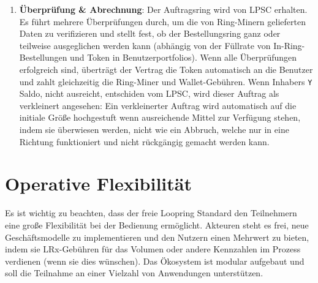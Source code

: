 \documentclass[UTF8,nofonts]{article}
\makeatletter
\newenvironment{figurehere}
 {\def\@captype{figure}}
 {}
\makeatother
\begin{document}
\begin{multicols}{2}
\begin{enumerate}
\item \textbf{Überprüfung \& Abrechnung}: Der Auftragsring wird von LPSC erhalten. Es führt mehrere Überprüfungen durch, um die von Ring-Minern gelieferten Daten zu verifizieren und stellt fest, ob der Bestellungsring ganz oder teilweise ausgeglichen werden kann (abhängig von der Füllrate von In-Ring-Bestellungen und Token in Benutzerportfolios). Wenn alle Überprüfungen erfolgreich sind, überträgt der Vertrag die Token automatisch an die Benutzer und zahlt gleichzeitig die Ring-Miner und Wallet-Gebühren. Wenn Inhabers \verb|Y| Saldo, nicht ausreicht, entschiden vom LPSC, wird dieser Auftrag als verkleinert angesehen: Ein verkleinerter Auftrag wird automatisch auf die initiale Größe hochgestuft wenn ausreichende Mittel zur Verfügung stehen, indem sie überwiesen werden, nicht wie ein Abbruch, welche nur in eine Richtung funktioniert und nicht rückgängig gemacht werden kann.

\end{enumerate}





%
%
%

\section{Operative Flexibilität\label{sec:business_model}}
Es ist wichtig zu beachten, dass der freie Loopring Standard den Teilnehmern eine große Flexibilität bei der Bedienung ermöglicht. Akteuren steht es frei, neue Geschäftsmodelle zu implementieren und den Nutzern einen Mehrwert zu bieten, indem sie LRx-Gebühren für das Volumen oder andere Kennzahlen im Prozess verdienen (wenn sie dies wünschen). Das Ökosystem ist modular aufgebaut und soll die Teilnahme an einer Vielzahl von Anwendungen unterstützen.


\end{multicols}
\end{document}
